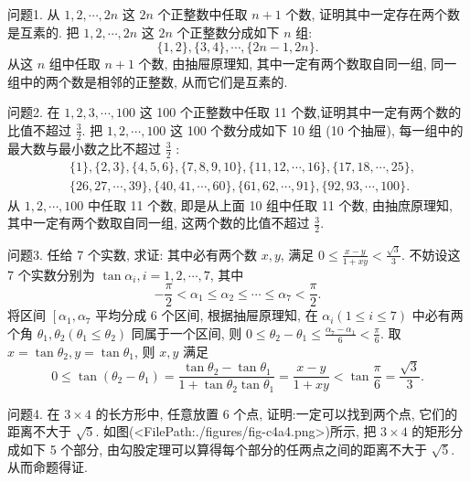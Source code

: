 
问题1. 从 $1,2, \cdots, 2 n$ 这 $2 n$ 个正整数中任取 $n+1$ 个数, 证明其中一定存在两个数是互素的.
把 $1,2, \cdots, 2 n$ 这 $2 n$ 个正整数分成如下 $n$ 组:
$$
\{1,2\},\{3,4\}, \cdots,\{2 n-1,2 n\} .
$$
从这 $n$ 组中任取 $n+1$ 个数, 由抽屉原理知, 其中一定有两个数取自同一组, 同一组中的两个数是相邻的正整数, 从而它们是互素的.



问题2. 在 $1,2,3, \cdots, 100$ 这 100 个正整数中任取 11 个数,证明其中一定有两个数的比值不超过 $\frac{3}{2}$.
把 $1,2, \cdots, 100$ 这 100 个数分成如下 10 组 (10 个抽屉), 每一组中的最大数与最小数之比不超过 $\frac{3}{2}$ :
$$
\begin{aligned}
& \{1\},\{2,3\},\{4,5,6\},\{7,8,9,10\},\{11,12, \cdots, 16\},\{17,18, \cdots, 25\}, \\
& \{26,27, \cdots, 39\},\{40,41, \cdots, 60\},\{61,62, \cdots, 91\},\{92,93, \cdots, 100\} .
\end{aligned}
$$
从 $1,2, \cdots, 100$ 中任取 11 个数, 即是从上面 10 组中任取 11 个数, 由抽庶原理知, 其中一定有两个数取自同一组, 这两个数的比值不超过 $\frac{3}{2}$.



问题3. 任给 7 个实数, 求证: 其中必有两个数 $x, y$, 满足 $0 \leqslant \frac{x-y}{1+x y}<\frac{\sqrt{3}}{3}$. 
不妨设这 7 个实数分别为 $\tan \alpha_i, i=1,2, \cdots, 7$, 其中
$$
-\frac{\pi}{2}<\alpha_1 \leqslant \alpha_2 \leqslant \cdots \leqslant \alpha_7<\frac{\pi}{2} .
$$
将区间 $\left[\alpha_1, \alpha_7\right.$ 平均分成 6 个区间, 根据抽屉原理知, 在 $\alpha_i(1 \leqslant i \leqslant 7)$ 中必有两个角 $\theta_1, \theta_2\left(\theta_1 \leqslant \theta_2\right)$ 同属于一个区间, 则 $0 \leqslant \theta_2-\theta_1 \leqslant \frac{\alpha_7-\alpha_1}{6}<\frac{\pi}{6}$.
取 $x=\tan \theta_2, y=\tan \theta_1$, 则 $x, y$ 满足
$$
0 \leqslant \tan \left(\theta_2-\theta_1\right)=\frac{\tan \theta_2-\tan \theta_1}{1+\tan \theta_2 \tan \theta_1}=\frac{x-y}{1+x y}<\tan \frac{\pi}{6}=\frac{\sqrt{3}}{3} .
$$



问题4. 在 $3 \times 4$ 的长方形中, 任意放置 6 个点, 证明:一定可以找到两个点, 它们的距离不大于 $\sqrt{5}$. 
如图(<FilePath:./figures/fig-c4a4.png>)所示, 把 $3 \times 4$ 的矩形分成如下 5 个部分, 由勾股定理可以算得每个部分的任两点之间的距离不大于 $\sqrt{5}$. 从而命题得证.




